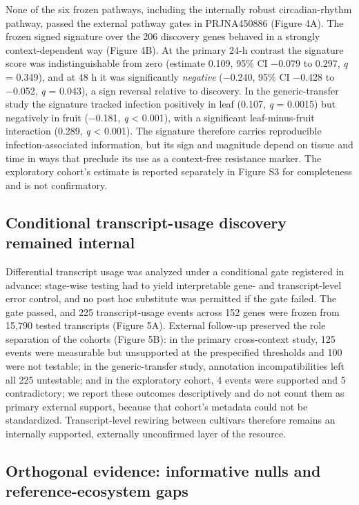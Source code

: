 \documentclass[12pt,letterpaper]{article}
\begin{document}
None of the six frozen pathways, including the internally robust circadian-rhythm pathway, passed the external pathway gates in PRJNA450886 (Figure 4A). The frozen signed signature over the 206 discovery genes behaved in a strongly context-dependent way (Figure 4B). At the primary 24-h contrast the signature score was indistinguishable from zero (estimate 0.109, 95\% CI −0.079 to 0.297, \textit{q} = 0.349), and at 48 h it was significantly \textit{negative} (−0.240, 95\% CI −0.428 to −0.052, \textit{q} = 0.043), a sign reversal relative to discovery. In the generic-transfer study the signature tracked infection positively in leaf (0.107, \textit{q} = 0.0015) but negatively in fruit (−0.181, \textit{q} < 0.001), with a significant leaf-minus-fruit interaction (0.289, \textit{q} < 0.001). The signature therefore carries reproducible infection-associated information, but its sign and magnitude depend on tissue and time in ways that preclude its use as a context-free resistance marker. The exploratory cohort's estimate is reported separately in Figure S3 for completeness and is not confirmatory.

\subsection*{Conditional transcript-usage discovery remained internal}

Differential transcript usage was analyzed under a conditional gate registered in advance: stage-wise testing had to yield interpretable gene- and transcript-level error control, and no post hoc substitute was permitted if the gate failed. The gate passed, and 225 transcript-usage events across 152 genes were frozen from 15,790 tested transcripts (Figure 5A). External follow-up preserved the role separation of the cohorts (Figure 5B): in the primary cross-context study, 125 events were measurable but unsupported at the prespecified thresholds and 100 were not testable; in the generic-transfer study, annotation incompatibilities left all 225 untestable; and in the exploratory cohort, 4 events were supported and 5 contradictory; we report these outcomes descriptively and do not count them as primary external support, because that cohort's metadata could not be standardized. Transcript-level rewiring between cultivars therefore remains an internally supported, externally unconfirmed layer of the resource.

\subsection*{Orthogonal evidence: informative nulls and reference-ecosystem gaps}
\end{document}
